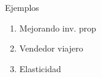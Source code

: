\documentclass[14pt,aspectratio=169,xcolor=dvipsnames]{beamer}
\begin{document}
\begin{frame}{Ejemplos}
    \begin{enumerate}
        \item Mejorando inv. prop
        \item Vendedor viajero
        \item Elasticidad
    \end{enumerate}
\end{frame}
\begin{frame}
    \maketitle
\end{frame}
\end{document}
